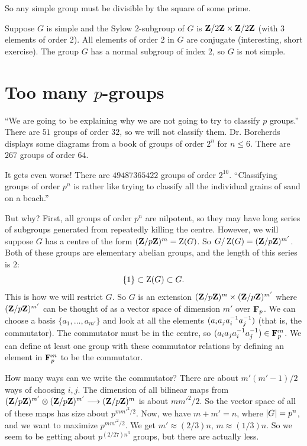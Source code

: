 \documentclass[11pt, oneside]{amsart}
\begin{document}
So any simple group must be divisible by the square of some prime. 

Suppose $G$ is simple and the Sylow $2$-subgroup of $G$ is $\mathbf Z / 2\mathbf Z\times \mathbf Z / 2\mathbf Z$ (with $3$ elements of order $2$). All elements of order $2$ in $G$ are conjugate (interesting, short exercise). The group $G$ has a normal subgroup of index $2$, so $G$ is not simple.

\section{Too many $p$-groups}
``We are going to be explaining why we are not going to try to classify $p$ groups.'' There are $51$ groups of order $32$, so we will not classify them. Dr. Borcherds displays some diagrams from a book of groups of order $2^n$ for $n \le 6$. There are $267$ groups of order $64$. 

It gets even worse! There are $49487365422$ groups of order $2^{10}$. ``Classifying groups of order $p^n$ is rather like trying to classify all the individual grains of sand on a beach.'' 

But why? First, all groups of order $p^n$ are nilpotent, so they may have long series of subgroups generated from repeatedly killing the centre. However, we will suppose $G$ has a centre of the form $(\mathbf Z / p\mathbf Z)^m = \operatorname{Z}(G)$. So $G/\operatorname{Z}(G) = (\mathbf Z / p\mathbf Z)^{m'}$. Both of these groups are elementary abelian groups, and the length of this series is $2$:
$$
\{1\} \subset \operatorname{Z}(G) \subset G.
$$
This is how we will restrict $G$. So $G$ is an extension $(\mathbf Z / p\mathbf Z)^m \times (\mathbf Z / p\mathbf Z)^{m'}$ where $(\mathbf Z / p\mathbf Z)^{m'}$ can be thought of as a vector space of dimension $m'$ over $\mathbf F_p$. We can choose a basis $\{a_1,\hdots , a_{m'}\}$ and look at all the elements $(a_ia_ja_i^{-1} a_j^{-1})$ (that is, the commutator). The commutator must be in the centre,  so  $(a_ia_ja_i^{-1} a_j^{-1}) \in \mathbf F_p^m$. We can define at least one group with these commutator relations by defining an element in $\mathbf F_p^m$ to be the commutator. 

How many ways can we write the commutator? There are about $m'(m'-1)/2$ ways of choosing $i,j$. The dimension of all bilinear maps from $(\mathbf Z / p\mathbf Z)^{m'} \otimes (\mathbf Z / p\mathbf Z)^{m'} \longrightarrow (\mathbf Z / p\mathbf Z)^m$ is about $mm'^2 / 2$. So the vector space of all of these maps has size about $p^{mm'^2/2}$. Now, we have $m+m'=n$, where $\left \lvert G \right \rvert = p^n$, and we want to maximize $p^{mm'^2/2}$. We get $m' \approx (2/3)n$, $m \approx (1/3)n$. So we seem to be getting about $p^{(2/27) n^3}$ groups, but there are actually less.
\end{document}
